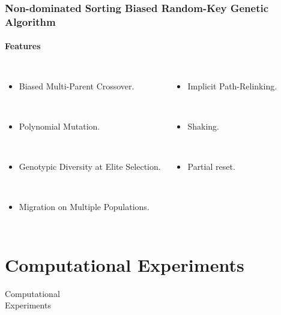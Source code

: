\documentclass[
	11pt, %
	aspectratio=169, %
]{beamer}
\begin{document}
\begin{frame}
\frametitle{Non-dominated Sorting Biased Random-Key Genetic Algorithm}
\framesubtitle{Features}

\begin{columns}[c,onlytextwidth]
\begin{itemize}
\item Biased Multi-Parent Crossover.

~\\

\item Polynomial Mutation.

~\\

\item Genotypic Diversity at Elite Selection.

~\\

\item Migration on Multiple Populations.
\end{itemize}
\begin{itemize}
\item Implicit Path-Relinking.

~\\

\item Shaking.

~\\

\item Partial reset.
\end{itemize}
\end{columns}
\end{frame}

\section{Computational Experiments}

\begin{frame}[plain]
\begin{center}
{\Huge Computational\\Experiments}
\end{center}
\end{frame}
\end{document}
